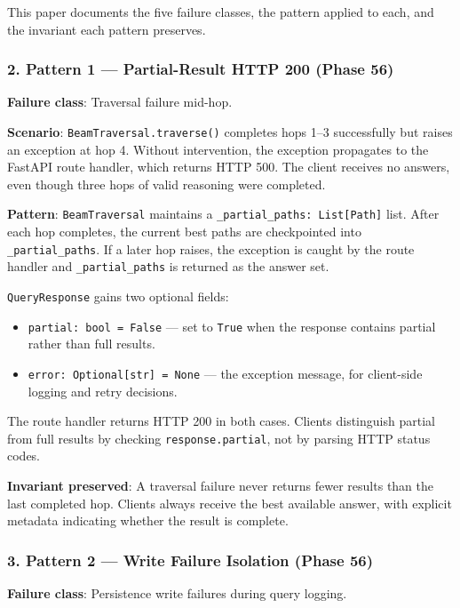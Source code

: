 This paper documents the five failure classes, the pattern applied to each, and the invariant each pattern preserves.

\subsubsection{2. Pattern 1 — Partial-Result HTTP 200 (Phase 56)}

\textbf{Failure class}: Traversal failure mid-hop.

\textbf{Scenario}: \texttt{BeamTraversal.traverse()} completes hops 1–3 succe\-ssfully but raises an exception at hop 4. Without inter\-vention, the exception propagates to the FastAPI route handler, which returns HTTP 500. The client receives no answers, even though three hops of valid reasoning were completed.

\textbf{Pattern}: \texttt{BeamTraversal} maintains a \texttt{\_partial\_paths: List[Path]} list. After each hop completes, the current best paths are check\-pointed into \texttt{\_partial\_paths}. If a later hop raises, the exception is caught by the route handler and \texttt{\_partial\_paths} is returned as the answer set.

\texttt{QueryResponse} gains two optional fields:
\begin{itemize}
\item \texttt{partial: bool = False} — set to \texttt{True} when the response contains partial rather than full results.
\item \texttt{error: Optional[str] = None} — the exception message, for client-side logging and retry decisions.

\end{itemize}
The route handler returns HTTP 200 in both cases. Clients distinguish partial from full results by checking \texttt{response.partial}, not by parsing HTTP status codes.

\textbf{Invariant preserved}: A traversal failure never returns fewer results than the last completed hop. Clients always receive the best available answer, with explicit metadata indicating whether the result is complete.

\subsubsection{3. Pattern 2 — Write Failure Isolation (Phase 56)}

\textbf{Failure class}: Persistence write failures during query logging.

